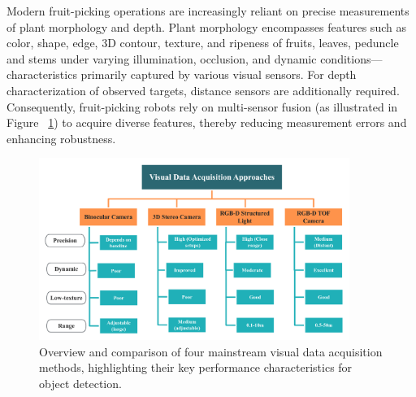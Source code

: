 \documentclass[pdflatex,sn-mathphys-num]{sn-jnl}
\begin{document}
Modern fruit-picking operations are increasingly reliant on precise measurements of plant morphology and depth. Plant morphology encompasses features such as color, shape, edge, 	3D contour, texture, and ripeness of fruits, leaves, peduncle and stems under varying illumination, occlusion, and dynamic conditions—characteristics primarily captured by various visual sensors. For depth characterization of observed targets, distance sensors are additionally required. 
Consequently, fruit-picking robots rely on multi-sensor fusion (as illustrated in Figure ~\ref{fig:camera}) to acquire diverse features, thereby reducing measurement errors and enhancing robustness.
\begin{figure}[hbtp]
\centering
\includegraphics[width=0.9\textwidth]{fig_camera1.png}
\caption{Overview and comparison of four mainstream visual data acquisition methods, highlighting their key performance characteristics for object detection.}
\label{fig:camera}
\end{figure}
\end{document}
